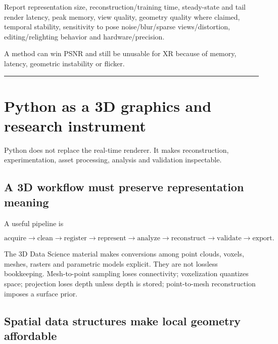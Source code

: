 Report representation size, reconstruction/training time, steady-state and tail render latency, peak memory, view quality, geometry quality where claimed, temporal stability, sensitivity to pose noise/blur/sparse views/distortion, editing/relighting behavior and hardware/precision.

A method can win PSNR and still be unusable for XR because of memory, latency, geometric instability or flicker.

\begin{center}\rule{0.5\linewidth}{0.5pt}\end{center}

\section{Python as a 3D graphics and research instrument}\label{04-visual-computing-ii-ch035-python-as-a-3d-graphics-and-research-instrument}

\hypertarget{04-visual-computing-ii-ch035-python-as-a-3d-graphics-and-research-instrument}{}

Python does not replace the real-time renderer. It makes reconstruction, experimentation, asset processing, analysis and validation inspectable.

\subsection{A 3D workflow must preserve representation meaning}\label{04-visual-computing-ii-ch035-a-3d-workflow-must-preserve-representation-meaning}

\hypertarget{04-visual-computing-ii-ch035-a-3d-workflow-must-preserve-representation-meaning}{}

A useful pipeline is

\[
\text{acquire}\rightarrow\text{clean}\rightarrow\text{register}\rightarrow
\text{represent}\rightarrow\text{analyze}\rightarrow
\text{reconstruct}\rightarrow\text{validate}\rightarrow\text{export}.
\]

The 3D Data Science material makes conversions among point clouds, voxels, meshes, rasters and parametric models explicit. They are not lossless bookkeeping. Mesh-to-point sampling loses connectivity; voxelization quantizes space; projection loses depth unless depth is stored; point-to-mesh reconstruction imposes a surface prior.

\subsection{Spatial data structures make local geometry affordable}\label{04-visual-computing-ii-ch035-spatial-data-structures-make-local-geometry-affordable}

